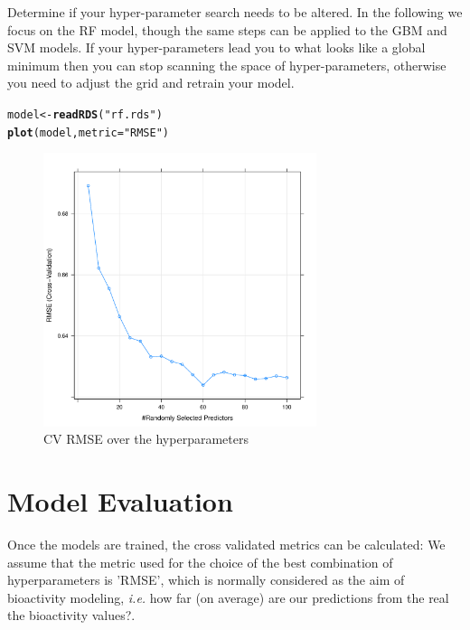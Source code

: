 \documentclass[twoside,a4wide,12pt]{article}\usepackage[]{graphicx}\usepackage[]{color}
\makeatletter
\newcommand{\hlstr}[1]{\textcolor[rgb]{0.192,0.494,0.8}{#1}}%
\newcommand{\hlstd}[1]{\textcolor[rgb]{0.345,0.345,0.345}{#1}}%
\newcommand{\hlkwb}[1]{\textcolor[rgb]{0.69,0.353,0.396}{#1}}%
\newcommand{\hlkwc}[1]{\textcolor[rgb]{0.333,0.667,0.333}{#1}}%
\newcommand{\hlkwd}[1]{\textcolor[rgb]{0.737,0.353,0.396}{\textbf{#1}}}%
\newenvironment{kframe}{%
 \def\at@end@of@kframe{}%
 \ifinner\ifhmode%
  \def\at@end@of@kframe{\end{minipage}}%
  \begin{minipage}{\columnwidth}%
 \fi\fi%
 \def\FrameCommand##1{\hskip\@totalleftmargin \hskip-\fboxsep
 \colorbox{shadecolor}{##1}\hskip-\fboxsep
     \hskip-\linewidth \hskip-\@totalleftmargin \hskip\columnwidth}%
 \MakeFramed {\advance\hsize-\width
   \@totalleftmargin\z@ \linewidth\hsize
   \@setminipage}}%
 {\par\unskip\endMakeFramed%
 \at@end@of@kframe}
\newenvironment{knitrout}{}{} %
\makeatother
\begin{document}
Determine if your hyper-parameter search needs to be altered. In the following we focus on the RF model, though the same steps can be applied to the GBM and SVM models. If your hyper-parameters lead you to what looks like a global minimum then you can stop scanning the space of hyper-parameters, otherwise you need to adjust the grid and retrain your model.
\begin{knitrout}
\color{fgcolor}\begin{kframe}
\begin{alltt}
\hlstd{model} \hlkwb{<-} \hlkwd{readRDS}\hlstd{(}\hlstr{"rf.rds"}\hlstd{)}
\hlkwd{plot}\hlstd{(model,} \hlkwc{metric} \hlstd{=} \hlstr{"RMSE"}\hlstd{)}
\end{alltt}
\end{kframe}\begin{figure}[]


{\centering \includegraphics[width=8cm]{figure/unnamed-chunk-17} 

}

\caption[CV RMSE over the hyperparameters]{CV RMSE over the hyperparameters\label{fig:unnamed-chunk-17}}
\end{figure}


\end{knitrout}

\section{Model Evaluation}

Once the models are trained, the cross validated metrics can be calculated:
We assume that the metric used for the choice of the best combination of hyperparameters is 'RMSE',
which is normally considered as the aim of bioactivity modeling, {\it i.e.} how far (on average) are our 
predictions from the real the bioactivity values?.
\end{document}
